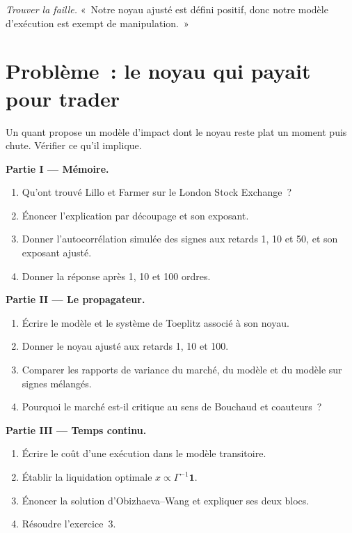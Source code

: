 \begin{exercise}[$\star\star\star$]\label{exo:mx:transient-impact-and-propagator-models:8}
\emph{Trouver la faille.} «~Notre noyau ajusté est défini positif, donc notre modèle d'exécution est exempt de manipulation.~»
\end{exercise}

\section{Problème~: le noyau qui payait pour trader}

\begin{problem}\label{pb:mx:transient-impact-and-propagator-models:1}
Un quant propose un modèle d'impact dont le noyau reste plat un moment puis chute. Vérifier ce qu'il implique.

\medskip\noindent\textbf{Partie I --- Mémoire.}
\begin{enumerate}
\item Qu'ont trouvé Lillo et Farmer sur le London Stock Exchange~?
\item Énoncer l'explication par découpage et son exposant.
\item Donner l'autocorrélation simulée des signes aux retards 1, 10 et 50, et son exposant ajusté.
\item Donner la réponse après 1, 10 et 100 ordres.
\end{enumerate}

\medskip\noindent\textbf{Partie II --- Le propagateur.}
\begin{enumerate}[resume]
\item Écrire le modèle et le système de Toeplitz associé à son noyau.
\item Donner le noyau ajusté aux retards 1, 10 et 100.
\item Comparer les rapports de variance du marché, du modèle et du modèle sur signes mélangés.
\item Pourquoi le marché est-il critique au sens de Bouchaud et coauteurs~?
\end{enumerate}

\medskip\noindent\textbf{Partie III --- Temps continu.}
\begin{enumerate}[resume]
\item Écrire le coût d'une exécution dans le modèle transitoire.
\item Établir la liquidation optimale $x\propto\Gamma^{-1}\mathbf 1$.
\item Énoncer la solution d'Obizhaeva--Wang et expliquer ses deux blocs.
\item Résoudre l'exercice~3.
\end{enumerate}


\end{problem}
